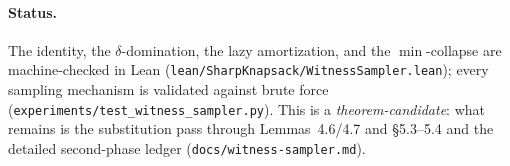 \documentclass[10pt]{article}
\begin{document}
\paragraph{Status.}
The identity, the $\delta$-domination, the lazy amortization, and the
$\min$-collapse are machine-checked in Lean
(\texttt{lean/SharpKnapsack/WitnessSampler.lean}); every sampling
mechanism is validated against brute force
(\texttt{experiments/test\_witness\_sampler.py}). This is a
\emph{theorem-candidate}: what remains is the substitution pass through
Lemmas~4.6/4.7 and \S5.3--5.4 and the detailed second-phase ledger
(\texttt{docs/witness-sampler.md}).
\end{document}

